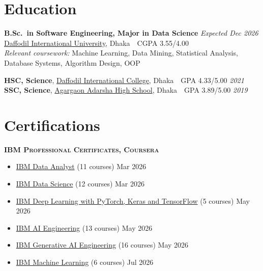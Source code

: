 \documentclass[10pt, letterpaper]{article}
\newcommand{\subhead}[1]{%
    {\small\bfseries\scshape #1}\par\vspace{1pt}%
}
\begin{document}
\section{Education}

\textbf{B.Sc.\ in Software Engineering, Major in Data Science} \hfill {\small\textit{Expected Dec 2026}}\\[-1pt]
\href{https://daffodilvarsity.edu.bd}{Daffodil International University}, Dhaka \,\textbar\, CGPA 3.55/4.00\\[1pt]
{\small\textit{Relevant coursework:} Machine Learning, Data Mining, Statistical Analysis, Database Systems,
Algorithm Design, OOP}

\vspace{3pt}
\textbf{HSC, Science}, \href{https://dic.edu.bd}{Daffodil International College}, Dhaka \,\textbar\, GPA 4.33/5.00
\hfill {\small\textit{2021}}\\[1pt]
\textbf{SSC, Science}, \href{https://aahs.edu.bd}{Agargaon Adarsha High School}, Dhaka \,\textbar\, GPA 3.89/5.00
\hfill {\small\textit{2019}}

\section{Certifications}

\subhead{IBM Professional Certificates, Coursera}
\begin{itemize}[topsep=0pt]
    \item \href{https://coursera.org/verify/professional-cert/Z9B4IMTTBUZ6}{IBM Data Analyst} (11 courses)
          \hfill {\small Mar 2026}
    \item \href{https://coursera.org/verify/professional-cert/OOKWP56I7MGP}{IBM Data Science} (12 courses)
          \hfill {\small Mar 2026}
    \item \href{https://coursera.org/verify/professional-cert/ADJH1ZK9SSUK}{IBM Deep Learning with PyTorch,
          Keras and TensorFlow} (5 courses) \hfill {\small May 2026}
    \item \href{https://coursera.org/verify/professional-cert/HZVMOPEAHRS6}{IBM AI Engineering} (13 courses)
          \hfill {\small May 2026}
    \item \href{https://coursera.org/verify/professional-cert/9FL2EW331MBX}{IBM Generative AI Engineering}
          (16 courses) \hfill {\small May 2026}
    \item \href{https://coursera.org/verify/professional-cert/34TJ036HZQMA}{IBM Machine Learning} (6 courses)
          \hfill {\small Jul 2026}
\end{itemize}
\end{document}

